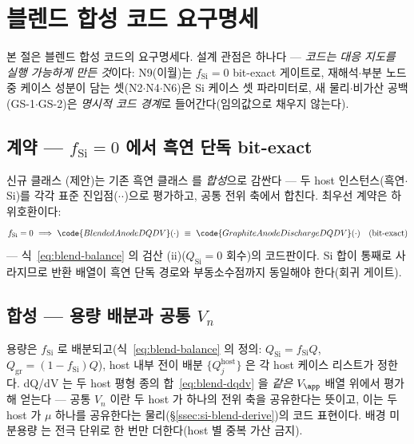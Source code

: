 \section{블렌드 합성 코드 요구명세}\label{sec:si-code}
본 절은 블렌드 합성 코드의 요구명세다. 설계 관점은 하나다 ---
\emph{코드는 대응 지도를 실행 가능하게 만든 것}이다: N9(이월)는 $f_\mathrm{Si}{=}0$ bit-exact
게이트로, 재해석$\cdot$부분 노드 중 케이스 성분이 담는 셋(N2$\cdot$N4$\cdot$N6)은 Si 케이스 셋 파라미터로, 새 물리$\cdot$비가산 공백
(GS-1$\cdot$GS-2)은 \emph{명시적 코드 경계}로 들어간다(임의값으로 채우지 않는다).

\subsection{계약 --- $f_\mathrm{Si}{=}0$ 에서 흑연 단독 bit-exact}\label{ssec:code-contract}
신규 클래스 (제안)는 기존 흑연 클래스
 를 \emph{합성}으로 감싼다 --- 두 host 인스턴스(흑연$\cdot$Si)를 각각
표준 진입점($\cdot$$\cdot$)으로 평가하고, 공통 전위 축에서
합친다. 최우선 계약은 하위호환이다:
\begin{equation}
f_\mathrm{Si}=0\ \Longrightarrow\ \code{BlendedAnodeDQDV}(\cdot)\ \equiv\ \code{GraphiteAnodeDischargeDQDV}(\cdot)
\quad(\text{bit-exact})
\label{eq:si-code-bitexact}
\end{equation}
--- 식~\eqref{eq:blend-balance} 의 검산 (ii)($Q_\mathrm{Si}{=}0$ 회수)의 코드판이다. Si 합이 통째로
사라지므로 반환 배열이 흑연 단독 경로와 부동소수점까지 동일해야 한다(회귀 게이트).

\subsection{합성 --- 용량 배분과 공통 $V_n$}\label{ssec:code-synth}
용량은 $f_\mathrm{Si}$ 로 배분되고(식~\eqref{eq:blend-balance} 의 정의: $Q_\mathrm{Si}{=}f_\mathrm{Si}Q$,
$Q_\mathrm{gr}{=}(1{-}f_\mathrm{Si})Q$), host 내부 전이 배분 $\{Q_j^{\mathrm{host}}\}$ 은 각 host 케이스
리스트가 정한다. dQ/dV 는 두 host 평형 종의 합~\eqref{eq:blend-dqdv} 을 \emph{같은} $V_\app$ 배열
위에서 평가해 얻는다 --- 공통 $V_n$ 이란 두 host 가 하나의 전위 축을 공유한다는 뜻이고, 이는 두 host 가
$\mu$ 하나를 공유한다는 물리(\S\ref{ssec:si-blend-derive})의 코드 표현이다. 배경 미분용량  는
전극 단위로 한 번만 더한다(host 별 중복 가산 금지).

